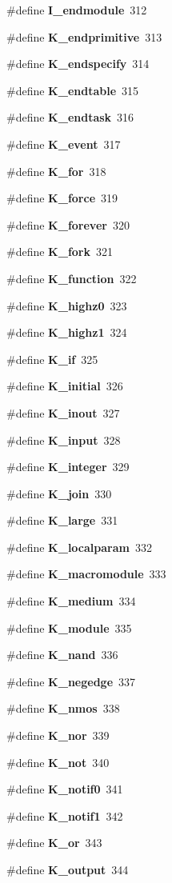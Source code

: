 \begin{CompactItemize}
\#define {\bf I\_\-endmodule}\ 312
\item 
\#define {\bf K\_\-endprimitive}\ 313
\item 
\#define {\bf K\_\-endspecify}\ 314
\item 
\#define {\bf K\_\-endtable}\ 315
\item 
\#define {\bf K\_\-endtask}\ 316
\item 
\#define {\bf K\_\-event}\ 317
\item 
\#define {\bf K\_\-for}\ 318
\item 
\#define {\bf K\_\-force}\ 319
\item 
\#define {\bf K\_\-forever}\ 320
\item 
\#define {\bf K\_\-fork}\ 321
\item 
\#define {\bf K\_\-function}\ 322
\item 
\#define {\bf K\_\-highz0}\ 323
\item 
\#define {\bf K\_\-highz1}\ 324
\item 
\#define {\bf K\_\-if}\ 325
\item 
\#define {\bf K\_\-initial}\ 326
\item 
\#define {\bf K\_\-inout}\ 327
\item 
\#define {\bf K\_\-input}\ 328
\item 
\#define {\bf K\_\-integer}\ 329
\item 
\#define {\bf K\_\-join}\ 330
\item 
\#define {\bf K\_\-large}\ 331
\item 
\#define {\bf K\_\-localparam}\ 332
\item 
\#define {\bf K\_\-macromodule}\ 333
\item 
\#define {\bf K\_\-medium}\ 334
\item 
\#define {\bf K\_\-module}\ 335
\item 
\#define {\bf K\_\-nand}\ 336
\item 
\#define {\bf K\_\-negedge}\ 337
\item 
\#define {\bf K\_\-nmos}\ 338
\item 
\#define {\bf K\_\-nor}\ 339
\item 
\#define {\bf K\_\-not}\ 340
\item 
\#define {\bf K\_\-notif0}\ 341
\item 
\#define {\bf K\_\-notif1}\ 342
\item 
\#define {\bf K\_\-or}\ 343
\item 
\#define {\bf K\_\-output}\ 344
\item 

\end{CompactItemize}
